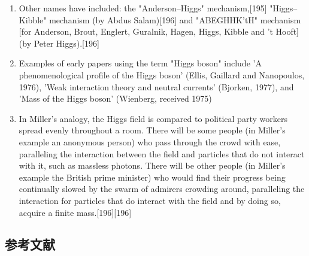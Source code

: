 \begin{enumerate}
\item Other names have included: the "Anderson–Higgs" mechanism,[195] "Higgs–Kibble" mechanism (by Abdus Salam)[196] and "ABEGHHK'tH" mechanism [for Anderson, Brout, Englert, Guralnik, Hagen, Higgs, Kibble and 't Hooft] (by Peter Higgs).[196]
\item Examples of early papers using the term "Higgs boson" include 'A phenomenological profile of the Higgs boson' (Ellis, Gaillard and Nanopoulos, 1976), 'Weak interaction theory and neutral currents' (Bjorken, 1977), and 'Mass of the Higgs boson' (Wienberg, received 1975)
\item In Miller's analogy, the Higgs field is compared to political party workers spread evenly throughout a room. There will be some people (in Miller's example an anonymous person) who pass through the crowd with ease, paralleling the interaction between the field and particles that do not interact with it, such as massless photons. There will be other people (in Miller's example the British prime minister) who would find their progress being continually slowed by the swarm of admirers crowding around, paralleling the interaction for particles that do interact with the field and by doing so, acquire a finite mass.[196][196]
\end{enumerate}

\subsection{参考文献}

